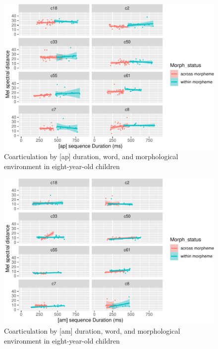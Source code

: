 \documentclass[a4paper,man,floatsintext,natbib,donotrepeattitle, apacite]{apa6}
\begin{document}
\begin{figure}
\centering
\includegraphics{3_ch3_results_files/figure-latex/eight-facet-ap-1.pdf}
\caption{\label{fig:eight-facet-ap}Coarticulation by {[}ap{]} duration, word, and morphological environment in eight-year-old children}
\end{figure}

\begin{figure}
\centering
\includegraphics{3_ch3_results_files/figure-latex/eight-facet-am-1.pdf}
\caption{\label{fig:eight-facet-am}Coarticulation by {[}am{]} duration, word, and morphological environment in eight-year-old children}
\end{figure}
\end{document}
